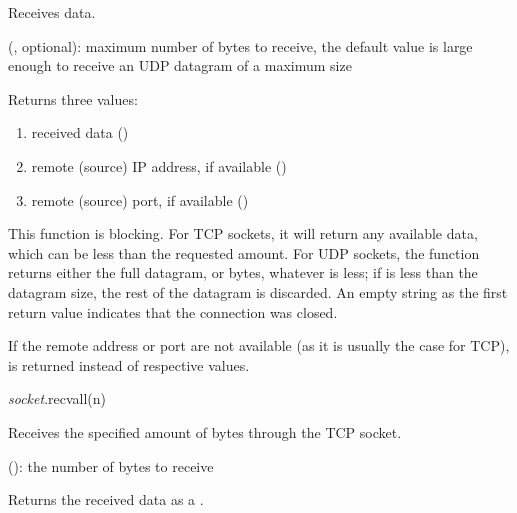 \documentclass[a4paper,12pt,twoside,extrafontsizes]{memoir}
\begin{document}
\begin{funcdescr}
	Receives data.
\end{funcdescr}

\begin{funcparams}
	 (, optional): maximum number of bytes to receive, the default value is large enough to receive an UDP datagram of a maximum size
\end{funcparams}

\begin{funcret}
	Returns three values:
	\begin{enumerate}
		\item received data ()
		\item remote (source) IP address, if available ()
		\item remote (source) port, if available ()
	\end{enumerate}
\end{funcret}

\begin{funcremarks}
	This function is blocking. For TCP sockets, it will return any available data, which can be less than the requested amount. For UDP sockets, the function returns either the full datagram, or  bytes, whatever is less; if  is less than the datagram size, the rest of the datagram is discarded. An empty string as the first return value indicates that the connection was closed.
	
	If the remote address or port are not available (as it is usually the case for TCP),  is returned instead of respective values.
\end{funcremarks}


\begin{luafuncprototype}
	\emph{socket}.recvall(n)
\end{luafuncprototype}

\begin{funcdescr}
	Receives the specified amount of bytes through the TCP socket.
\end{funcdescr}

\begin{funcparams}
	 (): the number of bytes to receive
\end{funcparams}

\begin{funcret}
	Returns the received data as a .
\end{funcret}
\end{document}

